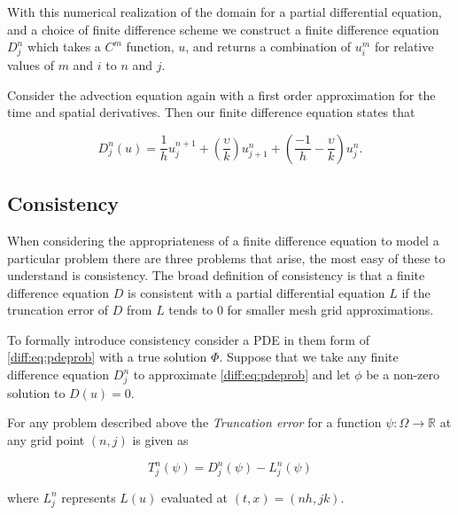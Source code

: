 \documentclass[../main.tex]{subfiles}
\begin{document}
  With this numerical realization of the domain for a partial differential equation, and a choice of finite difference scheme we construct a finite difference equation $D^n_j$ which takes a $C^m$ function, $u$, and returns a combination of $u^m_i$ for relative values of $m$ and $i$ to $n$ and $j$.

  \begin{example}
    Consider the advection equation again with a first order approximation for the time and spatial derivatives. Then our finite difference equation states that

    \begin{equation} \label{diff:eq:advectionexample}
      D^n_j(u) = \frac{1}{h} u^{n+1}_j + \left( \frac{\upsilon}{k} \right) u^n_{j+1} + \left( \frac{-1}{h} - \frac{\upsilon}{k} \right) u^n_j.
    \end{equation}
  \end{example}

  \subsection{Consistency} \label{diff:sec:consistency}
  When considering the appropriateness of a finite difference equation to model a particular problem there are three problems that arise, the most easy of these to understand is consistency. The broad definition of consistency is that a finite difference equation $D$ is consistent with a partial differential equation $L$ if the truncation error of $D$ from $L$ tends to $0$ for smaller mesh grid approximations.

  To formally introduce consistency consider a PDE in them form of \autoref{diff:eq:pdeprob} with a true solution $\Phi$. Suppose that we take any finite difference equation $D^n_j$ to approximate \autoref{diff:eq:pdeprob} and let $\phi$ be a non-zero solution to $D(u) = 0$.

  \begin{definition}
    For any problem described above the \emph{Truncation error} for a function $\psi : \Omega \to \mathbb{R}$ at any grid point $(n, j)$ is given as

    \begin{equation}
      T^n_j(\psi) = D^n_j(\psi) - L^n_j(\psi)
    \end{equation}

    where $L^n_j$ represents $L(u)$ evaluated at $(t, x) = (n h, j k)$.
  \end{definition}
\end{document}
